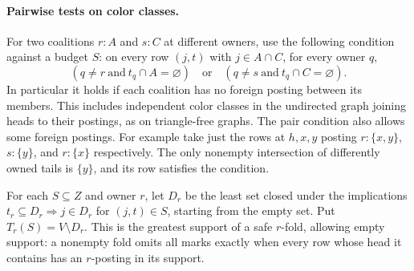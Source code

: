 

\paragraph{Pairwise tests on color classes.}
For two coalitions $r:A$ and $s:C$ at different owners, use the
following condition against a budget $S$: on every row $(j,t)$
with $j\in A\cap C$, for every owner $q$,
\[
  (q\ne r\ \text{and}\ t_q\cap A=\varnothing)
  \quad\text{or}\quad
  (q\ne s\ \text{and}\ t_q\cap C=\varnothing).
\]
In particular it holds if each coalition has no foreign posting
between its members. This includes independent color classes in
the undirected graph joining heads to their postings, as on
triangle-free graphs. The pair condition also allows some foreign
postings. For example take just the rows at $h,x,y$ posting
$r:\{x,y\}$, $s:\{y\}$, and $r:\{x\}$ respectively. The only
nonempty intersection of differently owned tails is $\{y\}$,
and its row satisfies the condition.

For each $S\subseteq Z$ and owner $r$, let $D_r$ be the least set
closed under the implications $t_r\subseteq D_r\Rightarrow j\in D_r$ for
$(j,t)\in S$, starting from the empty set. Put $T_r(S)=V\setminus D_r$.
This is the greatest support of a safe $r$-fold, allowing empty support:
a nonempty fold omits all marks exactly when every row whose head it
contains has an $r$-posting in its support.

